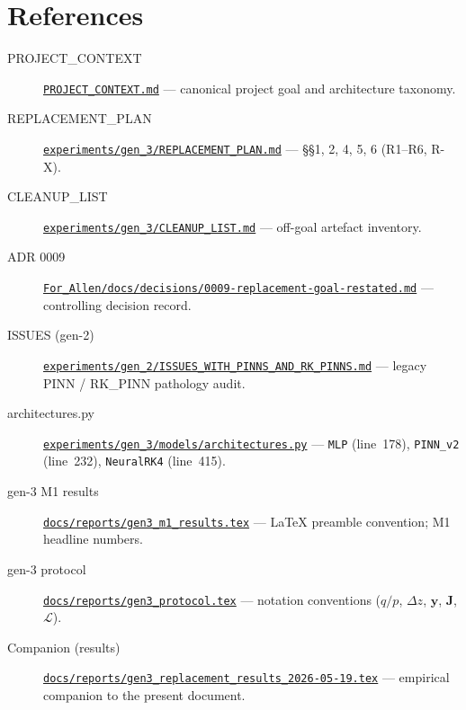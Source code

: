 \documentclass[11pt,a4paper]{article}
\newcommand{\qop}{q/p}
\newcommand{\dz}{\Delta z}
\newcommand{\state}{\mathbf{y}}
\newcommand{\Jac}{\mathbf{J}}
\newcommand{\loss}{\mathcal{L}}
\begin{document}
\section*{References}
\begin{description}
\item[PROJECT\_CONTEXT] \href{run:../../PROJECT_CONTEXT.md}{\texttt{PROJECT\_CONTEXT.md}} --- canonical project goal and architecture taxonomy.
\item[REPLACEMENT\_PLAN] \href{run:../../experiments/gen_3/REPLACEMENT_PLAN.md}{\texttt{experiments/gen\_3/REPLACEMENT\_PLAN.md}} --- §§1, 2, 4, 5, 6 (R1--R6, R-X).
\item[CLEANUP\_LIST] \href{run:../../experiments/gen_3/CLEANUP_LIST.md}{\texttt{experiments/gen\_3/CLEANUP\_LIST.md}} --- off-goal artefact inventory.
\item[ADR 0009] \href{run:../../experiments/gen_3/For_Allen/docs/decisions/0009-replacement-goal-restated.md}{\texttt{For\_Allen/docs/decisions/0009-replacement-goal-restated.md}} --- controlling decision record.
\item[ISSUES (gen-2)] \href{run:../../experiments/gen_2/ISSUES_WITH_PINNS_AND_RK_PINNS.md}{\texttt{experiments/gen\_2/ISSUES\_WITH\_PINNS\_AND\_RK\_PINNS.md}} --- legacy PINN / RK\_PINN pathology audit.
\item[architectures.py] \href{run:../../experiments/gen_3/models/architectures.py}{\texttt{experiments/gen\_3/models/architectures.py}} --- \texttt{MLP} (line~178), \texttt{PINN\_v2} (line~232), \texttt{NeuralRK4} (line~415).
\item[gen-3 M1 results] \href{run:gen3_m1_results.tex}{\texttt{docs/reports/gen3\_m1\_results.tex}} --- LaTeX preamble convention; M1 headline numbers.
\item[gen-3 protocol] \href{run:gen3_protocol.tex}{\texttt{docs/reports/gen3\_protocol.tex}} --- notation conventions ($\qop$, $\dz$, $\state$, $\Jac$, $\loss$).
\item[Companion (results)] \href{run:gen3_replacement_results_2026-05-19.tex}{\texttt{docs/reports/gen3\_replacement\_results\_2026-05-19.tex}} --- empirical companion to the present document.
\end{description}
\end{document}
